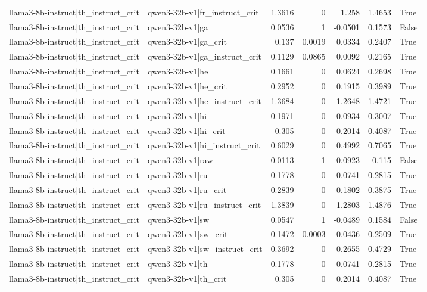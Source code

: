 \begin{table}
\begin{tabular}{l l r r r r l}
llama3-8b-instruct|th_instruct_crit & qwen3-32b-v1|fr_instruct_crit & 1.3616 & 0 & 1.258 & 1.4653 & True \\
llama3-8b-instruct|th_instruct_crit & qwen3-32b-v1|ga & 0.0536 & 1 & -0.0501 & 0.1573 & False \\
llama3-8b-instruct|th_instruct_crit & qwen3-32b-v1|ga_crit & 0.137 & 0.0019 & 0.0334 & 0.2407 & True \\
llama3-8b-instruct|th_instruct_crit & qwen3-32b-v1|ga_instruct_crit & 0.1129 & 0.0865 & 0.0092 & 0.2165 & True \\
llama3-8b-instruct|th_instruct_crit & qwen3-32b-v1|he & 0.1661 & 0 & 0.0624 & 0.2698 & True \\
llama3-8b-instruct|th_instruct_crit & qwen3-32b-v1|he_crit & 0.2952 & 0 & 0.1915 & 0.3989 & True \\
llama3-8b-instruct|th_instruct_crit & qwen3-32b-v1|he_instruct_crit & 1.3684 & 0 & 1.2648 & 1.4721 & True \\
llama3-8b-instruct|th_instruct_crit & qwen3-32b-v1|hi & 0.1971 & 0 & 0.0934 & 0.3007 & True \\
llama3-8b-instruct|th_instruct_crit & qwen3-32b-v1|hi_crit & 0.305 & 0 & 0.2014 & 0.4087 & True \\
llama3-8b-instruct|th_instruct_crit & qwen3-32b-v1|hi_instruct_crit & 0.6029 & 0 & 0.4992 & 0.7065 & True \\
llama3-8b-instruct|th_instruct_crit & qwen3-32b-v1|raw & 0.0113 & 1 & -0.0923 & 0.115 & False \\
llama3-8b-instruct|th_instruct_crit & qwen3-32b-v1|ru & 0.1778 & 0 & 0.0741 & 0.2815 & True \\
llama3-8b-instruct|th_instruct_crit & qwen3-32b-v1|ru_crit & 0.2839 & 0 & 0.1802 & 0.3875 & True \\
llama3-8b-instruct|th_instruct_crit & qwen3-32b-v1|ru_instruct_crit & 1.3839 & 0 & 1.2803 & 1.4876 & True \\
llama3-8b-instruct|th_instruct_crit & qwen3-32b-v1|sw & 0.0547 & 1 & -0.0489 & 0.1584 & False \\
llama3-8b-instruct|th_instruct_crit & qwen3-32b-v1|sw_crit & 0.1472 & 0.0003 & 0.0436 & 0.2509 & True \\
llama3-8b-instruct|th_instruct_crit & qwen3-32b-v1|sw_instruct_crit & 0.3692 & 0 & 0.2655 & 0.4729 & True \\
llama3-8b-instruct|th_instruct_crit & qwen3-32b-v1|th & 0.1778 & 0 & 0.0741 & 0.2815 & True \\
llama3-8b-instruct|th_instruct_crit & qwen3-32b-v1|th_crit & 0.305 & 0 & 0.2014 & 0.4087 & True \\

\end{tabular}
\end{table}
